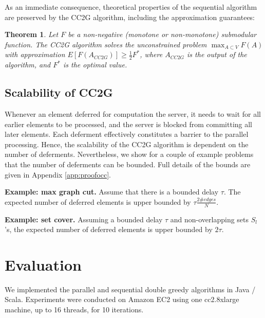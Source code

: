 \documentclass{article} %
\newcommand{\occ}{CC2G}
\newtheorem{thm}{Theorem}[section]
\begin{document}
As an immediate consequence, theoretical properties of the sequential algorithm are preserved by the \occ{} algorithm, including the approximation guarantees:

\begin{thm} Let $F$ be a non-negative (monotone or non-monotone) submodular function.
The \occ{} algorithm solves the unconstrained problem $\max_{A\subset V} F(A)$ with approximation
$E[F(A_{\occ{}})] \geq \frac{1}{2}F^*$,
where $A_{\occ{}}$ is the output of the algorithm, and $F^*$ is the optimal value.
\end{thm}




\subsection{Scalability of \occ{}}
Whenever an element deferred for computation the server, it needs to wait for all earlier elements to be processed, and the server is blocked from committing all later elements.
Each deferment effectively constitutes a barrier to the parallel processing.
Hence, the scalability of the \occ{} algorithm is dependent on the number of deferments.
Nevertheless, we show for a couple of example problems that the number of deferments can be bounded.
Full details of the bounds are given in Appendix \ref{app:proofocc}.

\textbf{Example: max graph cut.}
Assume that there is a bounded delay $\tau$.
The expected number of deferred elements is upper bounded by $\tau \frac{2\#edges}{N}$.

\textbf{Example: set cover.}
Assuming a bounded delay $\tau$ and non-overlapping sets $S_l$'s, the expected number of deferred elements is upper bounded by $2\tau$.

















\section{Evaluation}

We implemented the parallel and sequential double greedy algorithms in Java / Scala.
Experiments were conducted on Amazon EC2 using one cc2.8xlarge machine, up to 16 threads, for 10 iterations.
\end{document}
